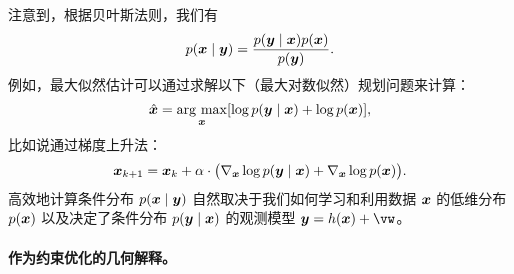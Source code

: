 \documentclass[../../book-main.tex]{subfiles}
\begin{document}
注意到，根据贝叶斯法则，我们有
\begin{equation}
  p(\bm{x}\mid \bm{y}) = \frac{p(\bm{y}\mid \bm{x}) p(\bm{x}) }{p(\bm{y})}.
\end{equation} 
例如，最大似然估计可以通过求解以下（最大对数似然）规划问题来计算：
\begin{equation}
    \hat{\bm{x}} = \operatorname*{arg\ max}_{\bm{x}} [\log p(\bm{y}\mid \bm{x}) + \log p(\bm{x})], 
\end{equation}
比如说通过梯度上升法：
\begin{equation}
    \bm{x}_{k+1} = \bm{x}_k + \alpha \cdot \big(\nabla_{\bm{x}} \log p(\bm{y} \mid \bm{x}) + \nabla_{\bm{x}} \log p(\bm{x})\big).
    \label{eqn:loglikelihoo-gradient-ascent}
\end{equation}
高效地计算条件分布 $p(\bm{x} \mid \bm{y})$ 自然取决于我们如何学习和利用数据 $\bm{x}$ 的低维分布 $p(\bm{x})$ 以及决定了条件分布 $p(\bm{y} \mid \bm{x})$ 的观测模型 $\y = h(\x) + \vw$。

\paragraph{作为约束优化的几何解释。}
\end{document}
